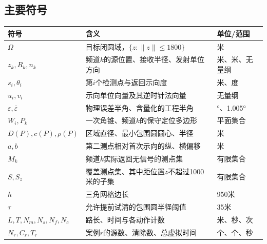 \documentclass[
  chinese,
  UTF8,
  a4paper,
  zihao=-4]{ctexart}
\begin{document}
\subsection{主要符号}\label{ux4e3bux8981ux7b26ux53f7}

\begin{longtable}[]{@{}
  >{\raggedright\arraybackslash}p{}
  >{\raggedright\arraybackslash}p{}
  >{\raggedright\arraybackslash}p{}@{}}
\toprule\noalign{}
\begin{minipage}[b]{\linewidth}\raggedright
符号
\end{minipage} & \begin{minipage}[b]{\linewidth}\raggedright
含义
\end{minipage} & \begin{minipage}[b]{\linewidth}\raggedright
单位/范围
\end{minipage} \\
\midrule\noalign{}
\endhead
\bottomrule\noalign{}
\endlastfoot
\(\Omega\) & 目标闭圆域，\(\{z:\|z\|\le1800\}\) & 米 \\
\(z_k,R_k,n_k\) & 频道\(k\)的源位置、接收半径、发射单位方向 &
米、米、无量纲 \\
\(s_i,\theta_i\) & 第\(i\)个检测点与返回示向度 & 米、度 \\
\(u_i,v_i\) & 示向单位向量及其逆时针法向量 & 无量纲 \\
\(\varepsilon,\bar\varepsilon\) & 物理误差半角、含量化的工程半角 &
1°、1.005° \\
\(W_i,P_k\) & 一次角锥、频道\(k\)的保守定位多边形 & 平面集合 \\
\(D(P),c(P),\rho(P)\) & 区域直径、最小包围圆圆心、半径 & 米 \\
\(a,b\) & 第二测点相对首次示向的纵、横偏移 & 米 \\
\(M_k\) & 频道\(k\)实际返回无信号的测点集 & 有限集合 \\
\(S,S_z\) & 覆盖测点集、其中距位置\(z\)不超过1000米的子集 & 有限集合 \\
\(h\) & 三角网格边长 & 950米 \\
\(\tau\) & 允许提前试清的包围圆半径阈值 & 35米 \\
\(L,T,N_m,N_s,N_f,N_c\) & 路长、时间与各动作计数 & 米、秒、次 \\
\(N_r,C_r,T_r\) & 案例\(r\)的源数、清除数、总虚拟时间 & 个、个、秒 \\
\end{longtable}
\end{document}
